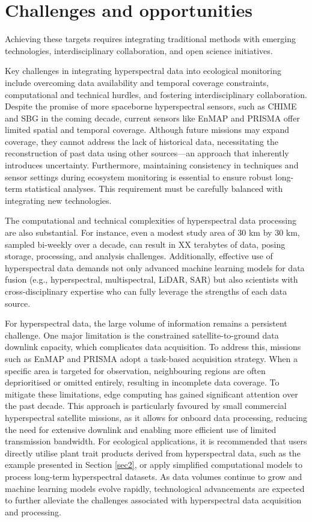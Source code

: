 \documentclass[pdflatex,sn-mathphys-num]{sn-jnl}%
\theoremstyle{thmstyleone}%
\theoremstyle{thmstyletwo}%
\theoremstyle{thmstylethree}%
\begin{document}
\section{Challenges and opportunities}\label{subsec2}
Achieving these targets requires integrating traditional methods with emerging technologies, interdisciplinary collaboration, and open science initiatives.

Key challenges in integrating hyperspectral data into ecological monitoring include overcoming data availability and temporal coverage constraints, computational and technical hurdles, and fostering interdisciplinary collaboration. Despite the promise of more spaceborne hyperspectral sensors, such as CHIME and SBG in the coming decade, current sensors like EnMAP and PRISMA offer limited spatial and temporal coverage. Although future missions may expand coverage, they cannot address the lack of historical data, necessitating the reconstruction of past data using other sources—an approach that inherently introduces uncertainty. Furthermore, maintaining consistency in techniques and sensor settings during ecosystem monitoring is essential to ensure robust long-term statistical analyses. This requirement must be carefully balanced with integrating new technologies.

The computational and technical complexities of hyperspectral data processing are also substantial. For instance, even a modest study area of 30 km by 30 km, sampled bi-weekly over a decade, can result in XX terabytes of data, posing storage, processing, and analysis challenges. Additionally, effective use of hyperspectral data demands not only advanced machine learning models for data fusion (e.g., hyperspectral, multispectral, LiDAR, SAR) but also scientists with cross-disciplinary expertise who can fully leverage the strengths of each data source. 

For hyperspectral data, the large volume of information remains a persistent challenge. One major limitation is the constrained satellite-to-ground data downlink capacity, which complicates data acquisition. To address this, missions such as EnMAP and PRISMA adopt a task-based acquisition strategy. When a specific area is targeted for observation, neighbouring regions are often deprioritised or omitted entirely, resulting in incomplete data coverage. To mitigate these limitations, edge computing has gained significant attention over the past decade. This approach is particularly favoured by small commercial hyperspectral satellite missions, as it allows for onboard data processing, reducing the need for extensive downlink and enabling more efficient use of limited transmission bandwidth. For ecological applications, it is recommended that users directly utilise plant trait products derived from hyperspectral data, such as the example presented in Section \ref{sec2}, or apply simplified computational models to process long-term hyperspectral datasets. As data volumes continue to grow and machine learning models evolve rapidly, technological advancements are expected to further alleviate the challenges associated with hyperspectral data acquisition and processing.
\end{document}
